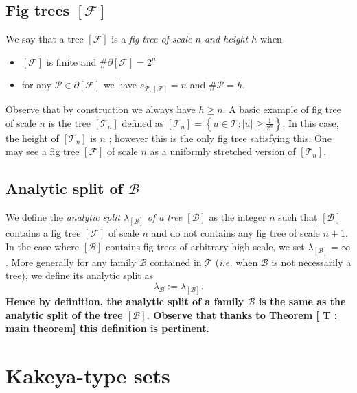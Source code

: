 \documentclass{article}
\begin{document}
\subsection*{Fig trees $\left[\mathcal{F} \right]$}

We say that a tree $[\mathcal{F}]$ is a \textit{fig tree of scale $n$ and height $h$} when  \begin{itemize}
    \item $[\mathcal{F}]$ is finite and $ \#\partial[\mathcal{F}] = 2^n $
    \item for any $\mathcal{P} \in \partial[\mathcal{F}]$ we have $ s_{\mathcal{P},[\mathcal{F}]} = n$ and $\# \mathcal{P} = h$.
\end{itemize} Observe that by construction we always have $h \geq n$. A basic example of fig tree of scale $n$ is the tree $[\mathcal{T}_n]$ defined as $[\mathcal{T}_n] = \left\{ u \in \mathcal{T} : |u| \geq \frac{1}{2^n} \right\}$. In this case, the height of $[\mathcal{T}_n]$ is $n$ ; however this is the only fig tree satisfying this. One may see a fig tree $[\mathcal{F}]$ of scale $n$ as a uniformly stretched version of $[\mathcal{T}_n]$.

\subsection*{Analytic split of $\mathcal{B}$}

We define the \textit{analytic split $\lambda_{[\mathcal{B}]}$ of a tree $[\mathcal{B}]$} as the integer $n$ such that $[\mathcal{B}]$ contains a fig tree $[\mathcal{F}]$ of scale $n$ and do not contains any fig tree of scale $n+1$. In the case where $[\mathcal{B}]$ contains fig trees of arbitrary high scale, we set $\lambda_{[\mathcal{B}]} = \infty$. More generally for any family $\mathcal{B}$ contained in $\mathcal{T}$ (\textit{i.e.} when $\mathcal{B}$ is not necessarily a tree), we define its analytic split as $$\lambda_\mathcal{B} := \lambda_{[\mathcal{B}]}.$$ \textbf{Hence by definition, the analytic split of a family $\mathcal{B}$ is the same as the analytic split of the tree $[\mathcal{B}]$. Observe that thanks to Theorem \ref{ T : main theorem} this definition is pertinent.}








\section{Kakeya-type sets}\label{S : tools}
\end{document}
